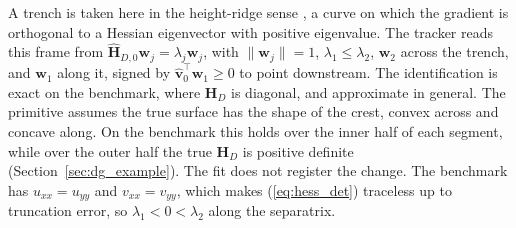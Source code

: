 \documentclass[lettersize,journal]{IEEEtran}
\begin{document}
A trench is taken here in the height-ridge sense \cite{33}, a curve on
which the gradient is orthogonal to a Hessian eigenvector with positive
eigenvalue. The tracker reads this frame from
$\hat{\mathbf{H}}_{D,0}\mathbf{w}_j = \lambda_j \mathbf{w}_j$, with
$\|\mathbf{w}_j\| = 1$, $\lambda_1 \leq \lambda_2$, $\mathbf{w}_2$ across
the trench, and $\mathbf{w}_1$ along it, signed by
$\hat{\mathbf{v}}_0^\top \mathbf{w}_1 \geq 0$ to point downstream. The
identification is exact on the benchmark, where $\mathbf{H}_D$ is
diagonal, and approximate in general. The primitive assumes the true
surface has the shape of the crest, convex across and concave along. On
the benchmark this holds over the inner half of each segment, while over
the outer half the true $\mathbf{H}_D$ is positive definite
(Section~\ref{sec:dg_example}). The fit does not register the change.
The benchmark has $u_{xx} = u_{yy}$ and $v_{xx} = v_{yy}$, which makes
(\ref{eq:hess_det}) traceless up to truncation error, so
$\lambda_1 < 0 < \lambda_2$ along the separatrix.
\end{document}
